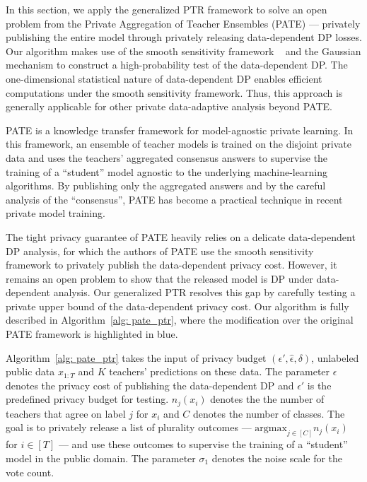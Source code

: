 In this section, we apply the generalized PTR framework to solve an open problem from the Private Aggregation of Teacher Ensembles (PATE) \citep{papernot2017, papernot2018scalable} --- privately publishing the entire model through privately releasing data-dependent DP losses. Our algorithm makes use of the smooth sensitivity framework ~\citep{nissim2007smooth} and the Gaussian mechanism to construct a high-probability test of the data-dependent DP. The one-dimensional statistical nature of data-dependent DP enables efficient computations under the smooth sensitivity framework. Thus, this approach is generally applicable for other private data-adaptive analysis beyond PATE.



PATE  is a knowledge transfer framework for model-agnostic private learning. In this framework,  an ensemble of teacher models is trained on the disjoint private data and uses the teachers' aggregated consensus answers to supervise the training of a ``student'' model agnostic to the underlying machine-learning algorithms. By publishing only the aggregated answers and by the careful analysis of the ``consensus'', PATE has become a practical technique in recent private model training. 


The tight privacy guarantee of PATE heavily relies on a delicate data-dependent DP analysis, for which the authors of PATE use the smooth sensitivity framework  to privately publish the data-dependent privacy cost. However, it remains an open problem to show that the released model is DP under  data-dependent analysis. Our generalized PTR resolves this gap by  carefully testing a private upper bound of the data-dependent privacy cost. Our algorithm is fully described in Algorithm~\ref{alg: pate_ptr}, where the modification over the original PATE framework is highlighted in blue.


 
Algorithm~\ref{alg: pate_ptr} takes the input of privacy budget $(\epsilon',\hat{\epsilon}, \delta)$, unlabeled public data $x_{1:T}$ and $K$ teachers' predictions on these data.  The parameter $\epsilon$ denotes the privacy cost of publishing the data-dependent DP and $\epsilon'$ is the predefined privacy budget for testing. $n_j(x_i)$ denotes the the number of teachers that agree on label $j$ for $x_i$ and $C$ denotes the number of classes. The goal is to privately release a list of plurality outcomes --- $\text{argmax}_{j\in[C]} n_j(x_i)$ for $i \in[T]$ --- and use these outcomes to supervise the training of a ``student'' model in the public domain. The parameter $\sigma_1$ denotes the noise scale for the vote count.


